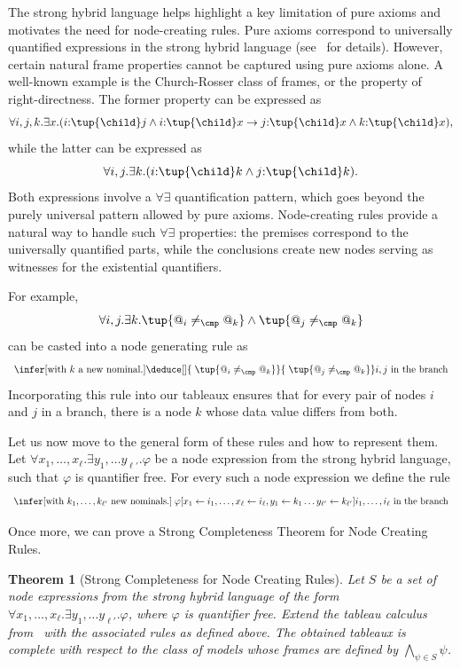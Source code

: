 \documentclass[10pt,a4paper]{amsart}
\newtheorem{thm}{Theorem}[section]
\theoremstyle{definition}
\theoremstyle{remark}
\begin{document}
The strong hybrid language helps highlight a key limitation of pure axioms and motivates the need for node-creating rules. Pure axioms correspond to universally quantified expressions in the strong hybrid language (see~\cite[Prop.~3.2]{Blackburn2002BeyondPA} for details). However, certain natural frame properties cannot be captured using pure axioms alone.
A well-known example is the Church-Rosser class of frames, or the property of right-directness. The former property can be expressed as 
\[
    \forall i,j,k.\exists x. (i{:}\tup{\child} j \land  i{:}\tup{\child}x \to j{:}\tup{\child}x \land k{:}\tup{\child}x),
\]
while the latter can be expressed as
\[
    \forall i,j.\exists k. (i{:}\tup{\child} k \land j{:}\tup{\child} k).
\]
Both expressions involve a $\forall\exists$ quantification pattern, which goes beyond the purely universal pattern allowed by pure axioms. Node-creating rules provide a natural way to handle such $\forall\exists$ properties: the premises correspond to the universally quantified parts, while the conclusions create new nodes serving as witnesses for the existential quantifiers.

For example,
\[
\forall i,j.\exists k. \tup{@_i\neq_\cmp @_k}\land\tup{@_j\neq_\cmp @_k}
\]
can be casted into a node generating rule as
\[
\begin{array}{c}
{\infer[\text{with $k$ a new nominal.}]
{
\deduce[]
{\phantom{|} {\tup{@_i\neq_\cmp @_k}}}    
{\phantom{|}{\tup{@_j\neq_\cmp @_k}}}}
{\text{$i,j$ in the branch}
}
}
\end{array}
\]
Incorporating this rule into our tableaux ensures that for every pair of nodes $i$ and $j$ in a branch, there is a node $k$ whose data value differs from both.

Let us now move to the general form of these rules and how to represent them. Let $\forall x_1,\ldots,x_\ell.\exists y_1,\ldots y_{\ell'}.\varphi$ be a node expression from the strong hybrid language, such that $\varphi$ is quantifier free. For every such a node expression we define the rule  
\[
\begin{array}{c}
{\infer[\text{with $k_1,\ldots,k_{\ell'}$ new nominals.}]
{
\phantom{|} {\varphi[x_1 \leftarrow i_1,\ldots,x_\ell \leftarrow i_\ell, y_1\leftarrow k_1\ldots y_{\ell'}\leftarrow k_{\ell'}]}}
{\text{$i_1,\ldots,i_{\ell}$ in the branch}}
}
\end{array}
\]

Once more, we can prove a Strong Completeness Theorem for Node Creating Rules.


\begin{thm}[Strong Completeness for Node Creating Rules]
    Let $S$ be a set of node expressions from the strong hybrid language of the form $\forall x_1,\ldots,x_\ell.\exists y_1,\ldots y_{\ell'}.\varphi$, where $\varphi$ is quantifier free.
    Extend the tableau calculus from~ with the associated rules as defined above. The obtained tableaux is complete with respect to the class of models whose frames are defined by $\bigwedge_{\psi\in S} \psi$.
\end{thm}
\end{document}
